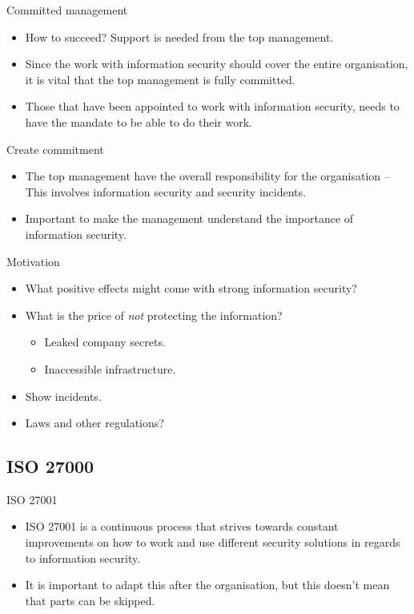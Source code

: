 \documentclass{beamer}
\begin{document}
\begin{frame}{Committed management}
  \begin{itemize}
    \item How to succeed?
      Support is needed from the top management.

    \item Since the work with information security should cover the entire
      organisation, it is vital that the top management is fully committed.

    \item Those that have been appointed to work with information security,
      needs to have the mandate to be able to do their work.

  \end{itemize}
\end{frame}

\begin{frame}{Create commitment}
  \begin{itemize}
    \item The top management have the overall responsibility for the
      organisation -- This involves information security and security incidents.
    \item Important to make the management understand the importance of
      information security.
  \end{itemize}
\end{frame}

\begin{frame}{Motivation}
  \begin{itemize}
    \item What positive effects might come with strong information security?
    \item What is the price of \emph{not} protecting the information?
      \begin{itemize}
        \item Leaked company secrets.
        \item Inaccessible infrastructure.
      \end{itemize}
    \item Show incidents.
    \item Laws and other regulations?
  \end{itemize}
\end{frame}

\subsection{ISO 27000}
\begin{frame}{ISO 27001}
  \begin{itemize}
    \item ISO 27001 is a continuous process that strives towards constant
      improvements on how to work and use different security solutions in
      regards to information security.
    \item It is important to adapt this after the organisation, but this doesn't
      mean that parts can be skipped.
  \end{itemize}
\end{frame}
\end{document}
